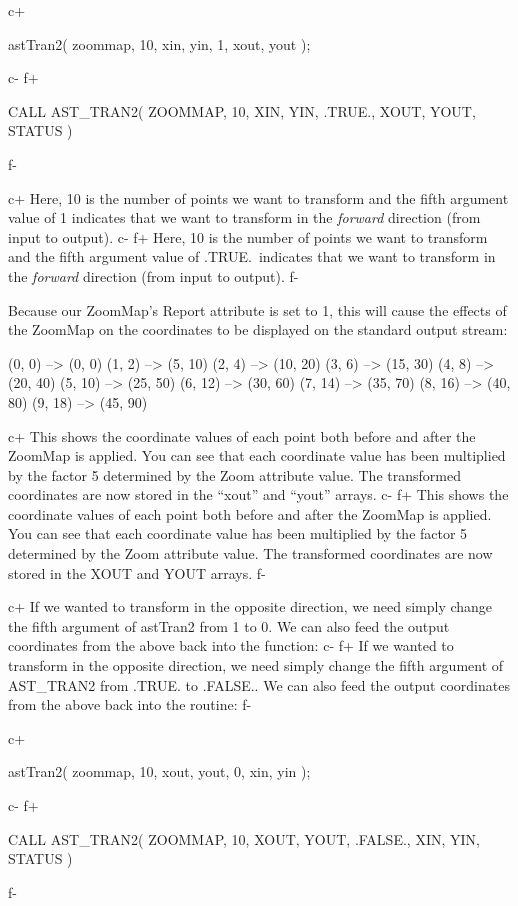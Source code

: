 \documentclass[twoside,11pt]{starlink}
\begin{document}
c+
\small
\begin{terminalv}
astTran2( zoommap, 10, xin, yin, 1, xout, yout );
\end{terminalv}
\normalsize
c-
f+
\small
\begin{terminalv}
      CALL AST_TRAN2( ZOOMMAP, 10, XIN, YIN, .TRUE., XOUT, YOUT, STATUS )
\end{terminalv}
\normalsize
f-

c+
Here, 10 is the number of points we want to transform and the fifth
argument value of 1 indicates that we want to transform in the
\emph{forward} direction (from input to output).
c-
f+
Here, 10 is the number of points we want to transform and the fifth
argument value of .TRUE.\ indicates that we want to transform in the
\emph{forward} direction (from input to output).
f-

Because our ZoomMap's Report attribute is set to 1, this will cause
the effects of the ZoomMap on the coordinates to be displayed on the
standard output stream:

\small
\begin{terminalv}
(0, 0) --> (0, 0)
(1, 2) --> (5, 10)
(2, 4) --> (10, 20)
(3, 6) --> (15, 30)
(4, 8) --> (20, 40)
(5, 10) --> (25, 50)
(6, 12) --> (30, 60)
(7, 14) --> (35, 70)
(8, 16) --> (40, 80)
(9, 18) --> (45, 90)
\end{terminalv}
\normalsize

c+
This shows the coordinate values of each point both before and after
the ZoomMap is applied. You can see that each coordinate value has
been multiplied by the factor 5 determined by the Zoom attribute
value. The transformed coordinates are now stored in the ``xout'' and
``yout'' arrays.
c-
f+
This shows the coordinate values of each point both before and after
the ZoomMap is applied. You can see that each coordinate value has
been multiplied by the factor 5 determined by the Zoom attribute
value. The transformed coordinates are now stored in the XOUT and YOUT
arrays.
f-

c+
If we wanted to transform in the opposite direction, we need simply
change the fifth argument of astTran2 from 1 to 0. We can also feed
the output coordinates from the above back into the function:
c-
f+
If we wanted to transform in the opposite direction, we need simply
change the fifth argument of AST\_TRAN2 from .TRUE. to .FALSE.. We can
also feed the output coordinates from the above back into the routine:
f-

c+
\small
\begin{terminalv}
astTran2( zoommap, 10, xout, yout, 0, xin, yin );
\end{terminalv}
\normalsize
c-
f+
\small
\begin{terminalv}
      CALL AST_TRAN2( ZOOMMAP, 10, XOUT, YOUT, .FALSE., XIN, YIN, STATUS )
\end{terminalv}
\normalsize
f-
\end{document}
